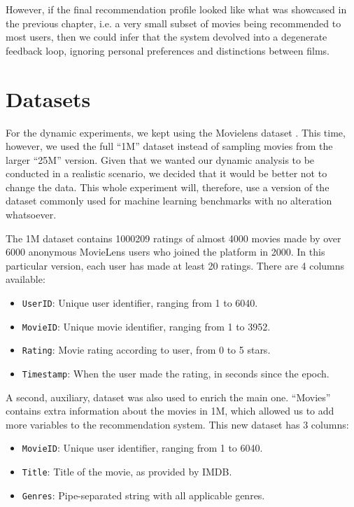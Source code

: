However, if the final recommendation profile looked like what was showcased in
the previous chapter, i.e. a very small subset of movies being recommended to
most users, then we could infer that the system devolved into a degenerate
feedback loop, ignoring personal preferences and distinctions between films.

\section{Datasets}
\label{sec:datasets04}

For the dynamic experiments, we kept using the Movielens dataset
\citep{harper_movielens_2015}. This time, however, we used the full ``1M''
dataset instead of sampling movies from the larger ``25M'' version. Given that
we wanted our dynamic analysis to be conducted in a realistic scenario, we
decided that it would be better not to change the data. This whole experiment
will, therefore, use a version of the dataset commonly used for machine learning
benchmarks with no alteration whatsoever.

The 1M dataset contains 1000209 ratings of almost 4000 movies made by over 6000
anonymous MovieLens users who joined the platform in 2000. In this particular
version, each user has made at least 20 ratings. There are 4 columns available:

\begin{itemize}
  \item \verb|UserID|: Unique user identifier, ranging from 1 to 6040.
  \item \verb|MovieID|: Unique movie identifier, ranging from 1 to 3952.
  \item \verb|Rating|: Movie rating according to user, from 0 to 5 stars.
  \item \verb|Timestamp|: When the user made the rating, in seconds since the
  epoch.
\end{itemize}

A second, auxiliary, dataset was also used to enrich the main one. ``Movies''
contains extra information about the movies in 1M, which allowed us to add more
variables to the recommendation system. This new dataset has 3 columns:

\begin{itemize}
  \item \verb|MovieID|: Unique user identifier, ranging from 1 to 6040.
  \item \verb|Title|: Title of the movie, as provided by IMDB.
  \item \verb|Genres|: Pipe-separated string with all applicable genres.
\end{itemize}

